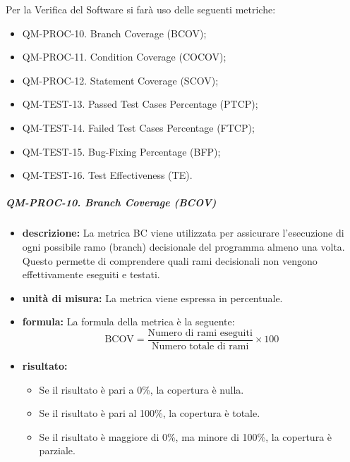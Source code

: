                          Per la Verifica del Software si farà uso delle seguenti metriche:

                        \begin{itemize}

                            \item QM-PROC-10. Branch Coverage (BCOV);
                            \item QM-PROC-11. Condition Coverage (COCOV);
                            \item QM-PROC-12. Statement Coverage (SCOV);
                            \item QM-TEST-13. Passed Test Cases Percentage (PTCP);
                            \item QM-TEST-14. Failed Test Cases Percentage (FTCP);
                            \item QM-TEST-15. Bug-Fixing Percentage (BFP);
                            \item QM-TEST-16. Test Effectiveness (TE).
                        \end{itemize}

                    \subparagraph{QM-PROC-10. Branch Coverage (BCOV)}

                    \begin{itemize}
                        
                        \item \textbf{descrizione: }
                            La metrica BC viene utilizzata per assicurare l'esecuzione di ogni possibile ramo (branch) decisionale del programma almeno una volta. Questo permette di comprendere quali rami decisionali non vengono effettivamente eseguiti e testati.

                        \item \textbf{unità di misura: }
                        La metrica viene espressa in percentuale.

                        \item \textbf{formula: }
                            La formula della metrica è la seguente:
                            \[
                                \text{BCOV} = \frac{\text{Numero di rami eseguiti}}{\text{Numero totale di rami}} \times 100
                            \]

                        \item \textbf{risultato: }
                        \begin{itemize}
                            \item Se il risultato è pari a 0\%, la copertura è nulla.
                            \item Se il risultato è pari al 100\%, la copertura è totale.
                            \item Se il risultato è maggiore di 0\%, ma minore di 100\%, la copertura è parziale.
                        \end{itemize}
                    \end{itemize}

